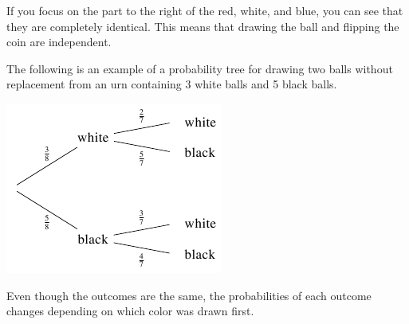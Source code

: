 \documentclass{ximera}
\begin{document}
If you focus on the part to the right of the red, white, and blue, you can see that they are completely identical. This means that drawing the ball and flipping the coin are independent.

The following is an example of a probability tree for drawing two balls without replacement from an urn containing 3 white balls and 5 black balls.

\begin{image}
\includegraphics{ProbTree2.png}
\end{image}

Even though the outcomes are the same, the probabilities of each outcome changes depending on which color was drawn first.
\end{document}

